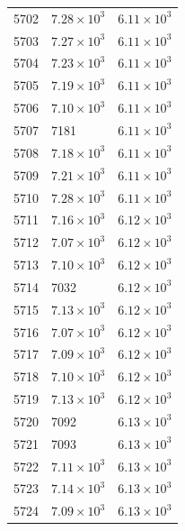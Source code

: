 \begin{table}[H]
\begin{tabular}{lll}
5702 & $\displaystyle 7.28 \times 10^{3}$ & $\displaystyle 6.11 \times 10^{3}$ \\
5703 & $\displaystyle 7.27 \times 10^{3}$ & $\displaystyle 6.11 \times 10^{3}$ \\
5704 & $\displaystyle 7.23 \times 10^{3}$ & $\displaystyle 6.11 \times 10^{3}$ \\
5705 & $\displaystyle 7.19 \times 10^{3}$ & $\displaystyle 6.11 \times 10^{3}$ \\
5706 & $\displaystyle 7.10 \times 10^{3}$ & $\displaystyle 6.11 \times 10^{3}$ \\
5707 & 7181 & $\displaystyle 6.11 \times 10^{3}$ \\
5708 & $\displaystyle 7.18 \times 10^{3}$ & $\displaystyle 6.11 \times 10^{3}$ \\
5709 & $\displaystyle 7.21 \times 10^{3}$ & $\displaystyle 6.11 \times 10^{3}$ \\
5710 & $\displaystyle 7.28 \times 10^{3}$ & $\displaystyle 6.11 \times 10^{3}$ \\
5711 & $\displaystyle 7.16 \times 10^{3}$ & $\displaystyle 6.12 \times 10^{3}$ \\
5712 & $\displaystyle 7.07 \times 10^{3}$ & $\displaystyle 6.12 \times 10^{3}$ \\
5713 & $\displaystyle 7.10 \times 10^{3}$ & $\displaystyle 6.12 \times 10^{3}$ \\
5714 & 7032 & $\displaystyle 6.12 \times 10^{3}$ \\
5715 & $\displaystyle 7.13 \times 10^{3}$ & $\displaystyle 6.12 \times 10^{3}$ \\
5716 & $\displaystyle 7.07 \times 10^{3}$ & $\displaystyle 6.12 \times 10^{3}$ \\
5717 & $\displaystyle 7.09 \times 10^{3}$ & $\displaystyle 6.12 \times 10^{3}$ \\
5718 & $\displaystyle 7.10 \times 10^{3}$ & $\displaystyle 6.12 \times 10^{3}$ \\
5719 & $\displaystyle 7.13 \times 10^{3}$ & $\displaystyle 6.12 \times 10^{3}$ \\
5720 & 7092 & $\displaystyle 6.13 \times 10^{3}$ \\
5721 & 7093 & $\displaystyle 6.13 \times 10^{3}$ \\
5722 & $\displaystyle 7.11 \times 10^{3}$ & $\displaystyle 6.13 \times 10^{3}$ \\
5723 & $\displaystyle 7.14 \times 10^{3}$ & $\displaystyle 6.13 \times 10^{3}$ \\
5724 & $\displaystyle 7.09 \times 10^{3}$ & $\displaystyle 6.13 \times 10^{3}$ \\

\end{tabular}
\end{table}
